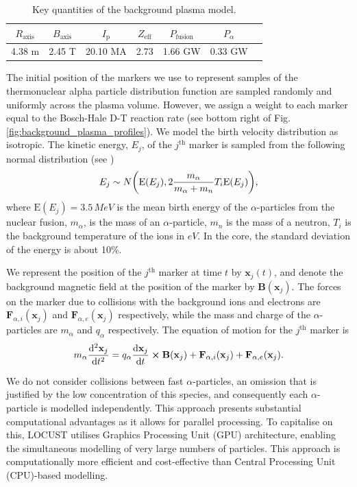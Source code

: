 \documentclass[10pt, a4paper, twoside]{article}
\begin{document}
\begin{table}[htbp]
\centering
\begin{tabular}{ccccccc}
\hline
$R_{\text{axis}}$ & $B_{\text{axis}}$ & $I_{\text{p}}$ & $Z_{\text{eff}}$ & $P_{\text{fusion}}$ & $P_{\alpha}$ \\
\hline
4.38 m & 2.45 T & 20.10 MA & 2.73 & 1.66 GW & 0.33 GW \\
\hline
\end{tabular}
\caption{Key quantities of the background plasma model.}
\label{table:fusion_params}
\end{table}

The initial position of the markers we use to represent samples of the thermonuclear alpha particle distribution function are sampled randomly and uniformly across the plasma volume. However, we assign a weight to each marker equal to the Bosch-Hale D-T reaction rate (see bottom right of Fig. \ref{fig:background_plasma_profiles}). We model the birth velocity distribution as isotropic. The kinetic energy, $E_j$, of the $j^{\text{th}}$ marker is sampled from the following normal distribution (see \cite{brysk1973})
\[E_j \sim N\qty(\text{E}(E_j), 2\frac{m_\alpha}{m_\alpha + m_n} T_i\text{E}(E_j) ),\]
where $\text{E}(E_j)=3.5\, \si{MeV}$ is the mean birth energy of the $\alpha$-particles from the nuclear fusion, $m_\alpha$, is the mass of an $\alpha$-particle, $m_n$ is the mass of a neutron, $T_i$ is the background temperature of the ions in $\si{eV}$. In the core, the standard deviation of the energy is about 10\%.

We represent the position of the $j^{\text{th}}$ marker at time $t$ by $\mathbf{x}_j(t)$, and denote
the background magnetic field at the position of the marker by $\textbf{B}(\mathbf{x}_j)$.
The forces on the marker due to collisions with the background ions and electrons are $\textbf{F}_{\alpha,i}(\mathbf{x}_j)$ and $\textbf{F}_{\alpha,e}(\mathbf{x}_j)$ respectively, while the mass and charge of the $\alpha$-particles are $m_\alpha$ and $q_\alpha$ respectively. The equation of motion for the $j^{\text{th}}$ marker is
\begin{equation}
m_\alpha\dv[2]{\mathbf{x}_j}{t} = q_\alpha\dv{\mathbf{x}_j}{t}\cross\textbf{B}(\mathbf{x}_j) + \textbf{F}_{\alpha,i}(\mathbf{x}_j) + \textbf{F}_{\alpha,e}(\mathbf{x}_j).
\end{equation}

We do not consider collisions between fast $\alpha$-particles, an omission that is justified by the low concentration of this species, and consequently each $\alpha$-particle is modelled independently. This approach presents substantial computational advantages as it allows for parallel processing. To capitalise on this, LOCUST utilises Graphics Processing Unit (GPU) architecture, enabling the simultaneous modelling of very large numbers of particles. This approach is computationally more efficient and cost-effective than Central Processing Unit (CPU)-based modelling.
\end{document}
